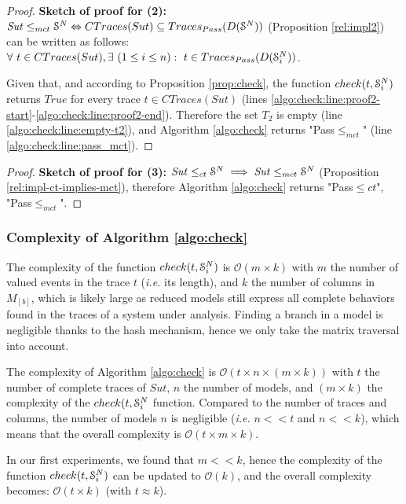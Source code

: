 \begin{proof}
    \textbf{Sketch of proof for (2):} $\mathit{Sut} \leq_{mct} \EuScript{S}^{N}
    \Leftrightarrow CTraces(Sut) \subseteq Traces_{Pass}(D(\EuScript{S}^N))$
    (Proposition \ref{rel:impl2}) can be written as
    follows: $\forall ~t \in CTraces(Sut), \exists ~(1
    \leq i \leq n) : ~t \in Traces_{Pass}(D(\EuScript{S}_i^{N}))$.

    Given that, and according to Proposition
    \ref{prop:check}, the function $check(t, \EuScript{S}_i^N)$ returns $True$ for
    every trace $t \in CTraces(Sut)$ (lines
    \ref{algo:check:line:proof2-start}-\ref{algo:check:line:proof2-end}).
    Therefore the set $T_2$ is empty
    (line \ref{algo:check:line:empty-t2}), and Algorithm
    \ref{algo:check} returns "Pass$\leq_{mct}$" (line
    \ref{algo:check:line:pass_mct}).
\end{proof}


\begin{proof}
    \textbf{Sketch of proof for (3):} $\mathit{Sut} \leq_{ct}
    \EuScript{S}^{N} \implies \mathit{Sut} \leq_{mct}
    \EuScript{S}^{N}$ (Proposition
    \ref{rel:impl-ct-implies-mct}), therefore Algorithm
    \ref{algo:check} returns "Pass$\leq{ct}$",
    "Pass$\leq_{mct}$".
\end{proof}

\subsubsection{Complexity of Algorithm \ref{algo:check}}

The complexity of the function $check(t, \EuScript{S}_i^{N})$ is
$\mathcal{O}(m \times k)$ with $m$ the number of valued events in
the trace $t$ (\emph{i.e.} its length), and $k$ the number of
columns in $M_{[b]}$, which is likely large as reduced models
still express all complete behaviors found in the traces of a
system under analysis. Finding a branch in a model is negligible
thanks to the hash mechanism, hence we only take the matrix
traversal into account.

The complexity of Algorithm \ref{algo:check} is $\mathcal{O}(t
\times n \times (m \times k))$ with $t$ the number of complete
traces of $\mathit{Sut}$, $n$ the number of models, and $(m
\times k)$ the complexity of the $check(t, \EuScript{S}_i^N$
function.  Compared to the number of traces and columns, the
number of models $n$ is negligible (\emph{i.e.} $n << t$ and $n
<< k$), which means that the overall complexity is $\mathcal{O}(t
\times m \times k)$.

In our first experiments, we found that $m << k$, hence the
complexity of the function $check(t, \EuScript{S}_i^N)$ can be
updated to $\mathcal{O}(k)$, and the overall complexity
becomes: $\mathcal{O}(t \times k)$ (with $t \approx k$).

\clearpage
